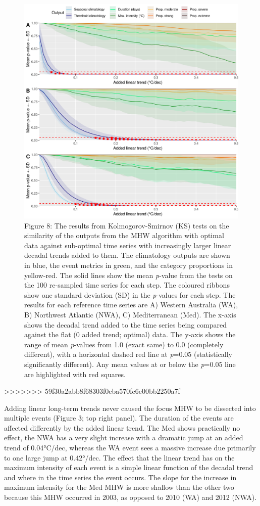 \documentclass[]{article}
\begin{document}
{\begin{figure}
\centering
\includegraphics{../LaTeX/fig_8.png}
\caption{Figure 8: The results from Kolmogorov-Smirnov (KS) tests on the
similarity of the outputs from the MHW algorithm with optimal data
against sub-optimal time series with increasingly larger linear decadal
trends added to them. The climatology outputs are shown in blue, the
event metrics in green, and the category proportions in yellow-red. The
solid lines show the mean \emph{p}-value from the tests on the 100
re-sampled time series for each step. The coloured ribbons show one
standard deviation (SD) in the \emph{p}-values for each step. The
results for each reference time series are A) Western Australia (WA), B)
Northwest Atlantic (NWA), C) Mediterranean (Med). The x-axis shows the
decadal trend added to the time series being compared against the flat
(0 added trend; optimal) data. The y-axis shows the range of mean
\emph{p}-values from 1.0 (exact same) to 0.0 (completely different),
with a horizontal dashed red line at \emph{p}=0.05 (statistically
significantly different). Any mean values at or below the \emph{p}=0.05
line are highlighted with red squares.}
\end{figure}
>>>>>>> 59f30a2abb8f68303f0eba570fc6e00bb2250a7f

Adding linear long-term trends never caused the focus MHW to be
dissected into multiple events (Figure 3; top right panel). The duration
of the events are affected differently by the added linear trend. The
Med shows practically no effect, the NWA has a very slight increase with
a dramatic jump at an added trend of 0.04°C/dec, whereas the WA event
sees a massive increase due primarily to one large jump at 0.42°/dec.
The effect that the linear trend has on the maximum intensity of each
event is a simple linear function of the decadal trend and where in the
time series the event occurs. The slope for the increase in maximum
intensity for the Med MHW is more shallow than the other two because
this MHW occurred in 2003, as opposed to 2010 (WA) and 2012 (NWA).

}
\end{document}
